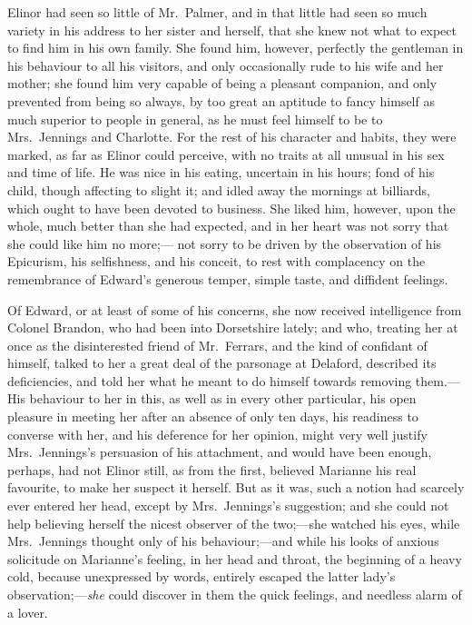 \documentclass{article}
\begin{document}
Elinor had seen so little of Mr.\ Palmer, and in that
little had seen so much variety in his address to her
sister and herself, that she knew not what to expect
to find him in his own family.  She found him, however,
perfectly the gentleman in his behaviour to all his visitors,
and only occasionally rude to his wife and her mother;
she found him very capable of being a pleasant companion,
and only prevented from being so always, by too great
an aptitude to fancy himself as much superior to people
in general, as he must feel himself to be to Mrs.\ Jennings
and Charlotte.  For the rest of his character and habits,
they were marked, as far as Elinor could perceive,
with no traits at all unusual in his sex and time of life.
He was nice in his eating, uncertain in his hours;
fond of his child, though affecting to slight it;
and idled away the mornings at billiards, which ought
to have been devoted to business.  She liked him, however,
upon the whole, much better than she had expected, and in
her heart was not sorry that she could like him no more;---%
not sorry to be driven by the observation of his Epicurism,
his selfishness, and his conceit, to rest with complacency
on the remembrance of Edward's generous temper, simple taste,
and diffident feelings.

Of Edward, or at least of some of his concerns,
she now received intelligence from Colonel Brandon,
who had been into Dorsetshire lately; and who,
treating her at once as the disinterested friend
of Mr.\ Ferrars, and the kind of confidant of himself,
talked to her a great deal of the parsonage at Delaford,
described its deficiencies, and told her what he meant
to do himself towards removing them.---His behaviour
to her in this, as well as in every other particular,
his open pleasure in meeting her after an absence
of only ten days, his readiness to converse with her,
and his deference for her opinion, might very well
justify Mrs.\ Jennings's persuasion of his attachment,
and would have been enough, perhaps, had not Elinor still,
as from the first, believed Marianne his real favourite,
to make her suspect it herself.  But as it was,
such a notion had scarcely ever entered her head,
except by Mrs.\ Jennings's suggestion; and she could
not help believing herself the nicest observer of the
two;---she watched his eyes, while Mrs.\ Jennings thought
only of his behaviour;---and while his looks of anxious
solicitude on Marianne's feeling, in her head and throat,
the beginning of a heavy cold, because unexpressed by words,
entirely escaped the latter lady's observation;---\emph{she} could
discover in them the quick feelings, and needless alarm
of a lover.
\end{document}
